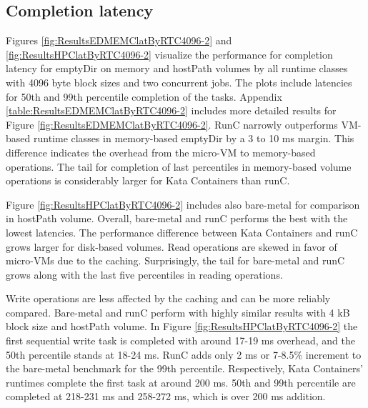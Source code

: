 \subsection{Completion latency}

Figures \ref{fig:ResultsEDMEMClatByRTC4096-2} and \ref{fig:ResultsHPClatByRTC4096-2} visualize the performance for completion latency for emptyDir on memory and hostPath volumes by all runtime classes with 4096 byte block sizes and two concurrent jobs. The plots include latencies for 50th and 99th percentile completion of the tasks. Appendix \ref{table:ResultsEDMEMClatByRTC4096-2} includes more detailed results for Figure \ref{fig:ResultsEDMEMClatByRTC4096-2}. RunC narrowly outperforms VM-based runtime classes in memory-based emptyDir by a 3 to 10 ms margin. This difference indicates the overhead from the micro-VM to memory-based operations. The tail for completion of last percentiles in memory-based volume operations is considerably larger for Kata Containers than runC.

Figure \ref{fig:ResultsHPClatByRTC4096-2} includes also bare-metal for comparison in hostPath volume. Overall, bare-metal and runC performs the best with the lowest latencies. The performance difference between Kata Containers and runC grows larger for disk-based volumes. Read operations are skewed in favor of micro-VMs due to the caching. Surprisingly, the tail for bare-metal and runC grows along with the last five percentiles in reading operations.

Write operations are less affected by the caching and can be more reliably compared. Bare-metal and runC perform with highly similar results with 4 kB block size and hostPath volume. In Figure \ref{fig:ResultsHPClatByRTC4096-2} the first sequential write task is completed with around 17-19 ms overhead, and the 50th percentile stands at 18-24 ms. RunC adds only 2 ms or 7-8.5\% increment to the bare-metal benchmark for the 99th percentile. Respectively, Kata Containers' runtimes complete the first task at around 200 ms. 50th and 99th percentile are completed at 218-231 ms and 258-272 ms, which is over 200 ms addition.

